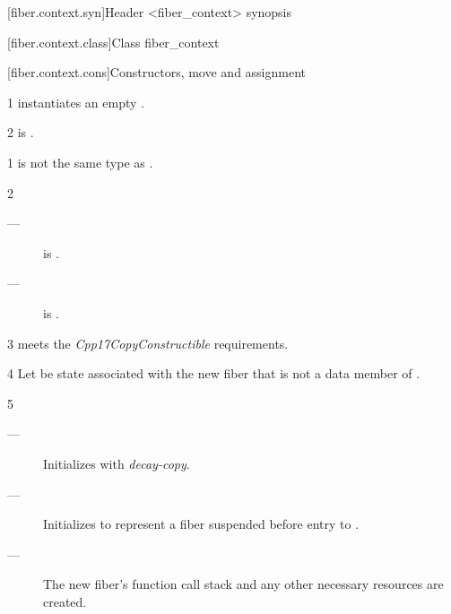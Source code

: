 [fiber.context.syn]{Header <fiber\_context> synopsis}


[fiber.context.class]{Class fiber\_context}


\newcommand{\state}{\cpp{state}}

[fiber.context.cons]{Constructors, move and assignment}
\label{constructor}

1 \effects instantiates an empty \fiber.

2 \postcond
\emptyfn is \true.


1 \constraints
{} is not the same type as \fiber.

2 \mandates
\begin{description}
    \item[---]  is \true.
    \item[---]  is \true.
\end{description}

3 \precond
{} meets the \emph{Cpp17CopyConstructible} requirements.

4 Let  be state associated with the new fiber
that is not a data member of \fiber. 

5 \effects
\begin{description}
    \item[---] Initializes  with \emph{decay-copy}.
    \item[---] Initializes  to represent a fiber suspended before
              entry to .
    \item[---] The new fiber's function call stack and any other necessary
              resources are created.
\end{description}

